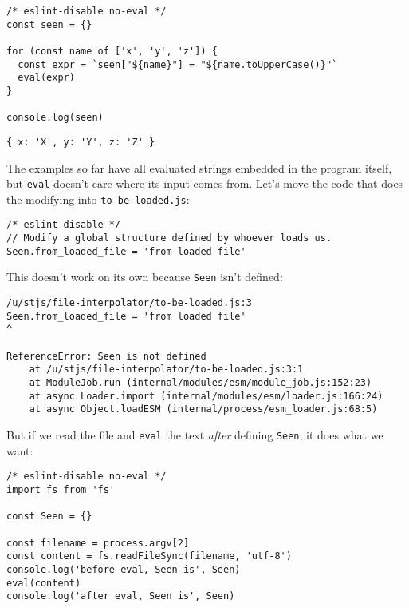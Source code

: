 \documentclass[krantzl]{krantz}
\begin{document}
\begin{lstlisting}[frame=single,frameround=tttt]
/* eslint-disable no-eval */
const seen = {}

for (const name of ['x', 'y', 'z']) {
  const expr = `seen["${name}"] = "${name.toUpperCase()}"`
  eval(expr)
}

console.log(seen)
\end{lstlisting}



\begin{lstlisting}[frame=single,frameround=tttt]
{ x: 'X', y: 'Y', z: 'Z' }
\end{lstlisting}



The examples so far have all evaluated strings embedded in the program itself,
but \texttt{eval} doesn't care where its input comes from.
Let's move the code that does the modifying into \texttt{to-be-loaded.js}:


\begin{lstlisting}[frame=single,frameround=tttt]
/* eslint-disable */
// Modify a global structure defined by whoever loads us.
Seen.from_loaded_file = 'from loaded file'
\end{lstlisting}



\noindent This doesn't work on its own because \texttt{Seen} isn't defined:


\begin{lstlisting}[frame=single,frameround=tttt]
/u/stjs/file-interpolator/to-be-loaded.js:3
Seen.from_loaded_file = 'from loaded file'
^

ReferenceError: Seen is not defined
    at /u/stjs/file-interpolator/to-be-loaded.js:3:1
    at ModuleJob.run (internal/modules/esm/module_job.js:152:23)
    at async Loader.import (internal/modules/esm/loader.js:166:24)
    at async Object.loadESM (internal/process/esm_loader.js:68:5)
\end{lstlisting}



\noindent But if we read the file and \texttt{eval} the text \emph{after} defining \texttt{Seen},
it does what we want:


\begin{lstlisting}[frame=single,frameround=tttt]
/* eslint-disable no-eval */
import fs from 'fs'

const Seen = {}

const filename = process.argv[2]
const content = fs.readFileSync(filename, 'utf-8')
console.log('before eval, Seen is', Seen)
eval(content)
console.log('after eval, Seen is', Seen)
\end{lstlisting}
\end{document}
